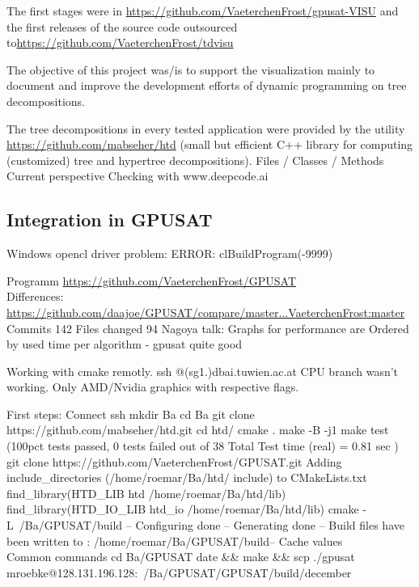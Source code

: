 \documentclass[a4paper, 12pt]{scrartcl}
\begin{document}
The first stages were in \url{https://github.com/VaeterchenFrost/gpusat-VISU} and the first releases of the source code outsourced to\url{https://github.com/VaeterchenFrost/tdvisu}

The objective of this project was/is to support the visualization mainly to document and improve the development efforts of dynamic programming on tree decompositions.

The tree decompositions in every tested application were provided by the utility \url{https://github.com/mabseher/htd} (small but efficient C++ library for computing (customized) tree and hypertree decompositions).
Files / Classes / Methods
Current 
perspective 
Checking with www.deepcode.ai

\newpage
\subsection{Integration in GPUSAT}
Windows opencl driver problem: ERROR: clBuildProgram(-9999)

Programm \url{https://github.com/VaeterchenFrost/GPUSAT} \\
Differences: \url{https://github.com/daajoe/GPUSAT/compare/master...VaeterchenFrost:master}  Commits 142 Files changed 94 
Nagoya talk:
Graphs for performance are Ordered by used time per algorithm - gpusat quite good

Working with cmake remotly. ssh @(sg1.)dbai.tuwien.ac.at
CPU branch wasn't working.
Only AMD/Nvidia graphics  with respective flags.

First steps:
Connect ssh
mkdir Ba
cd Ba
git clone https://github.com/mabseher/htd.git
 cd htd/
 cmake .
 make -B -j1 
 make test
 (100pct tests passed, 0 tests failed out of 38                                                                                                                                                                                                                                                                                                             Total Test time (real) =   0.81 sec )\\

git clone https://github.com/VaeterchenFrost/GPUSAT.git
Adding include\_directories (/home/roemar/Ba/htd/
include) to CMakeLists.txt \\
find\_library(HTD\_LIB htd /home/roemar/Ba/htd/lib)
find\_library(HTD\_IO\_LIB htd\_io /home/roemar/Ba/htd/lib) 
cmake - L~/Ba/GPUSAT/build
-- Configuring done
-- Generating done
-- Build files have been written to : /home/roemar/Ba/GPUSAT/build-- Cache values 
\\
Common commands
cd Ba/GPUSAT      
date \&\& make \&\& scp ./gpusat mroebke@128.131.196.128:~/Ba/GPUSAT/GPUSAT/build/december
\end{document}
